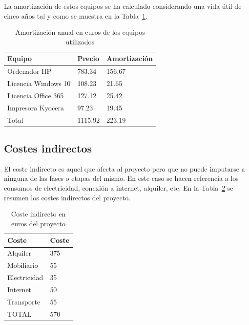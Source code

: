 La amortización de estos equipos se ha calculado considerando una vida útil de cinco años tal y como se muestra en la Tabla~\ref{tab:coste-equipos}.

\begin{table}[H]
    \centering
    \begin{tabular}{lll}
        \toprule
        Equipo              & Precio  & Amortización \\
        \midrule
        Ordenador HP        & 783.34  & 156.67       \\
        Licencia Windows 10 & 108.23  & 21.65        \\
        Licencia Office 365 & 127.12  & 25.42        \\
        Impresora Kyocera   & 97.23   & 19.45        \\
        \midrule
        Total               & 1115.92 & 223.19       \\
        \bottomrule
    \end{tabular}
    \caption{Amortización anual en euros de los equipos utilizados}
    \label{tab:coste-equipos}
\end{table}

\subsection{Costes indirectos}

El coste indirecto es aquel que afecta al proyecto pero que no puede imputarse a ninguna de las fases o etapas del mismo.
En este caso se hacen referencia a los consumos de electricidad, conexión a internet, alquiler, etc.
En la Tabla~\ref{tab:coste-indirecto} se resumen los costes indirectos del proyecto.

\begin{table}[H]
    \centering
    \begin{tabular}{ll}
        \toprule
        Coste        & Coste \\
        \midrule
        Alquiler     & 375   \\
        Mobiliario   & 55    \\
        Electricidad & 35    \\
        Internet     & 50    \\
        Transporte   & 55    \\
        \midrule
        TOTAL        & 570   \\
        \bottomrule
    \end{tabular}
    \caption{Coste indirecto en euros del proyecto}
    \label{tab:coste-indirecto}
\end{table}

